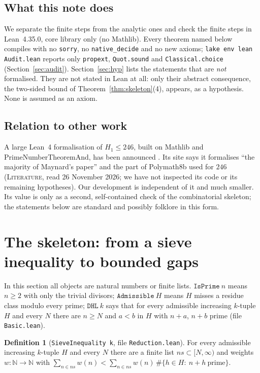\documentclass[11pt]{amsart}
\theoremstyle{definition}
\newtheorem{definition}[theorem]{Definition}
\theoremstyle{remark}
\newcommand{\lbl}[1]{\textup{\textsc{#1}}}
\newcommand{\tl}[1]{\texttt{#1}}
\begin{document}
\subsection*{What this note does}
We separate the finite steps from the analytic ones and check the finite
steps in Lean~4.35.0, core library only (no Mathlib). Every theorem named
below compiles with no \tl{sorry}, no \tl{native\_decide} and no new axioms;
\tl{lake env lean Audit.lean} reports only \tl{propext}, \tl{Quot.sound} and
\tl{Classical.choice} (Section~\ref{sec:audit}). Section~\ref{sec:hyp} lists
the statements that are \emph{not} formalised. They are not stated in Lean at
all: only their abstract consequence, the two-sided bound of
Theorem~\ref{thm:skeleton}(4), appears, as a hypothesis. None is assumed as an
axiom.

\subsection*{Relation to other work}
A large Lean~4 formalisation of $H_1\le246$, built on Mathlib and
PrimeNumberTheoremAnd, has been announced \cite{Axiom26}. Its site says it
formalises ``the majority of Maynard's paper'' and the part of Polymath8b
\cite{Pol14b} used for $246$ (\lbl{Literature}, read 26 November 2026; we have
not inspected its code or its remaining hypotheses). Our development is
independent of it and much smaller. Its value is only as a second,
self-contained check of the combinatorial skeleton; the statements below are
standard and possibly folklore in this form.

\section{The skeleton: from a sieve inequality to bounded gaps}\label{sec:skeleton}

In this section all objects are natural numbers or finite lists. $\tl{IsPrime}\ n$ means
$n\ge2$ with only the trivial divisors; $\tl{Admissible}\ H$ means $H$ misses a
residue class modulo every prime; $\tl{DHL}\ k$ says that for every admissible
increasing $k$-tuple $H$ and every $N$ there are $n\ge N$ and $a<b$ in $H$ with
$n+a$, $n+b$ prime (file \tl{Basic.lean}).

\begin{definition}[\tl{SieveInequality k}, file \tl{Reduction.lean}]
For every admissible increasing $k$-tuple $H$ and every $N$ there are a finite
list $ns\subset[N,\infty)$ and weights $w:\mathbb N\to\mathbb N$ with
$\sum_{n\in ns}w(n)<\sum_{n\in ns}w(n)\,\#\{h\in H:\ n+h\ \text{prime}\}$.
\end{definition}
\end{document}
